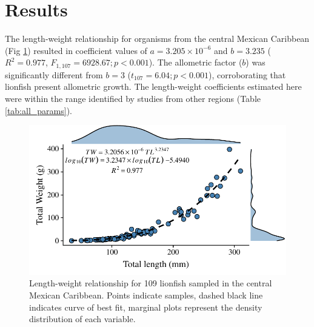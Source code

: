 \documentclass[fleqn,10pt,lineno]{wlpeerj} %
\providecommand{\DIFadd}[1]{{\protect\color{blue}\uwave{#1}}} %
\providecommand{\DIFaddbegin}{} %
\providecommand{\DIFaddend}{} %
\begin{document}
\clearpage

\section*{Results}

The length-weight relationship for organisms from the central Mexican
Caribbean (Fig \ref{fig:l-w-carib}) resulted in coefficient values of
\(a = 3.205 \times 10^{-6}\) and \(b = 3.235\) (\(R^2 = 0.977\),
\(F_{1, 107} = 6928.67; p < 0.001\)). The allometric factor (\(b\)) was
significantly different from \(b = 3\) (\(t_{107} = 6.04; p<0.001\)),
corroborating that lionfish present allometric growth. The length-weight
coefficients estimated here were within the range identified by studies
from other regions (\DIFaddbegin \DIFadd{Fig \ref{fig:all_allo}, }\DIFaddend Table \ref{tab:all_params}).

\begin{figure}
\centering
\includegraphics{Manuscript_files/figure-latex/fit1-1.pdf}
\caption{\label{fig:l-w-carib}Length-weight relationship for 109
lionfish sampled in the central Mexican Caribbean. Points indicate
samples, dashed black line indicates curve of best fit, marginal plots
represent the density distribution of each variable.}
\end{figure}
\end{document}

